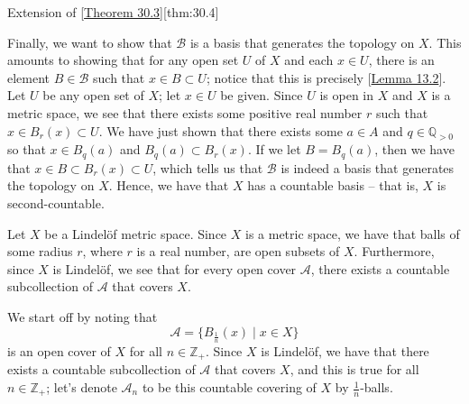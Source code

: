 \begin{thmBox}{Extension of [\hyperlink{thm:30.3}{Theorem 30.3}]}[thm:30.4]
\begin{proofBox}
        \baseSkip

        Finally, we want to show that \( \mathcal{B} \) is a basis that generates the 
        topology on \( X \).
        This amounts to showing that for any open set \( U \) of \( X \) and each
        \( x \in U \), there is an element \( B \in \mathcal{B} \) such that
        \( x \in B \subset U \); notice that this is precisely 
        [\hyperlink{lem:13.2}{Lemma 13.2}].
        Let \( U \) be any open set of \( X \); let \( x \in U \) be given.
        Since \( U \) is open in \( X \) and \( X \) is a metric space, we see that 
        there exists some positive real number \( r \) such that
        \( x \in B_{ r }( x ) \subset U \).
        We have just shown that there exists some \( a \in A \) and 
        \( q \in \mathbb{Q}_{ > 0 } \) so that \( x \in B_{ q }( a ) \) and 
        \( B_{ q }( a ) \subset B_{ r }( x ) \).
        If we let \( B = B_{ q }( a ) \), then we have that 
        \( x \in B \subset B_{ r }( x ) \subset U \), which tells us that 
        \( \mathcal{B} \) is indeed a basis that generates the topology on \( X \).
        Hence, we have that \( X \) has a countable basis -- that is, \( X \) is 
        second-countable.


        \baseSkip

        Let \( X \) be a Lindel\"{o}f metric space.
        Since \( X \) is a metric space, we have that balls of some radius \( r \), 
        where \( r \) is a real number, are open subsets of \( X \).
        Furthermore, since \( X \) is Lindel\"{o}f, we see that for every open cover
        \( \mathcal{A} \), there exists a countable subcollection of \( \mathcal{A} \) 
        that covers \( X \).
    
        \baseSkip
    
        We start off by noting that
        \begin{equation*}
            \mathcal{A}
            =
            \{ B_{ \frac{ 1 }{ n } }( x ) \mid x \in X \}
        \end{equation*}
        is an open cover of \( X \) for all \( n \in \mathbb{Z}_{ + } \).
        Since \( X \) is Lindel\"{o}f, we have that there exists a countable 
        subcollection of \( \mathcal{A} \) that covers \( X \), and this is true for 
        all \( n \in \mathbb{Z}_{ + } \); let's denote \( \mathcal{A}_{ n } \)
        to be this countable covering of \( X \) by \( \frac{ 1 }{ n } \)-balls.
    

\end{proofBox}
\end{thmBox}
